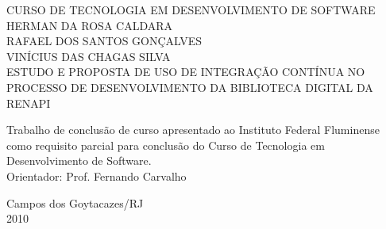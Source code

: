 \begin{titlepage}
 \begin{figure}[ht]
 \centering
 \end{figure}
 \begin{center}
   {\large CURSO DE TECNOLOGIA EM DESENVOLVIMENTO DE SOFTWARE} \\ [3.5cm]
   {\large HERMAN DA ROSA CALDARA} \\
   {\large RAFAEL DOS SANTOS GONÇALVES} \\
   {\large VINÍCIUS DAS CHAGAS SILVA} \\ [4cm]
   {\large ESTUDO E PROPOSTA DE USO DE INTEGRAÇÃO CONTÍNUA NO PROCESSO DE DESENVOLVIMENTO DA BIBLIOTECA DIGITAL DA RENAPI}\\ [2cm]
   \hspace{.45\textwidth} %
   \begin{minipage}{0.5\textwidth}
   \begin{espacosimples}
        Trabalho de conclusão de curso apresentado ao Instituto Federal Fluminense como requisito parcial para conclusão do Curso de Tecnologia em Desenvolvimento de Software.\\[1.5cm]
        Orientador: Prof. Fernando Carvalho
    \end{espacosimples}
    \end{minipage}
   \vfill
   {\large Campos dos Goytacazes/RJ} \\
   {\large 2010}
 \end{center}
\end{titlepage}

